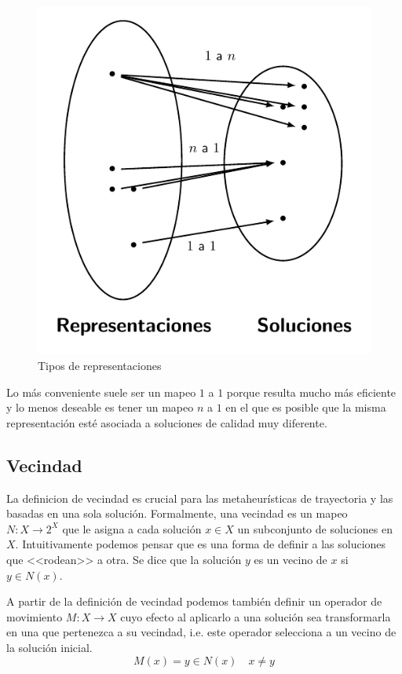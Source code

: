 \begin{figure}[H]
    \centering
    \includegraphics[scale=1]{Imagenes/representacion.pdf}
    \caption{Tipos de representaciones}
\end{figure}

Lo más conveniente suele ser un mapeo $1$ a $1$ porque resulta mucho más eficiente y lo menos deseable es tener un mapeo $n$ a $1$ en el que es posible que la misma representación esté asociada a soluciones de calidad muy diferente. 


\subsection{Vecindad}
La definicion de vecindad es crucial para las metaheurísticas de trayectoria y las basadas en una sola solución.
Formalmente, una vecindad es un mapeo $N:X\rightarrow 2^X$ que le asigna a cada solución $x\in X$ un subconjunto de soluciones en $X$. Intuitivamente podemos pensar que es una forma de definir a las soluciones que <<rodean>> a otra. Se dice que la solución $y$ es un vecino de $x$ si $y\in N(x)$.

A partir de la definición de vecindad podemos también definir un operador de movimiento $M:X\rightarrow X$ cuyo efecto al aplicarlo a una solución sea transformarla en una que pertenezca a su vecindad, i.e. este operador selecciona a un vecino de la solución inicial.  
\[M(x)=y\in N(x)\quad x\neq y\]

